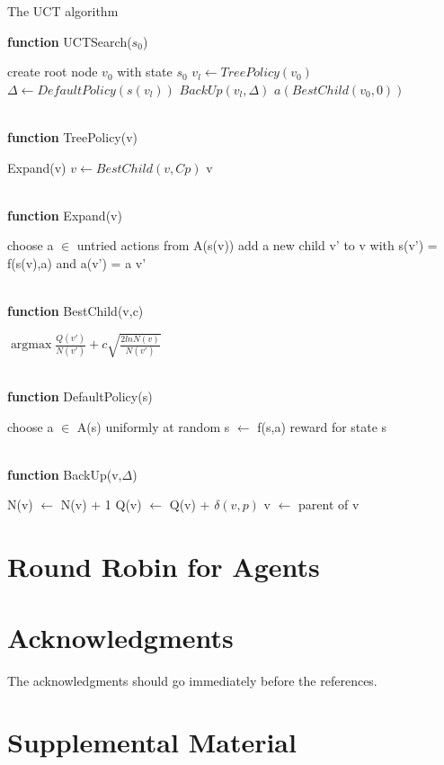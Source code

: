 \documentclass[11pt,a4paper]{article}
\begin{document}
\begin{algorithm}[h]
\caption{The UCT algorithm} 
\hspace*{0.02in} {\bf function} 
UCTSearch($s_0$) 
\begin{algorithmic}
\State create root node $v_0$ with state $s_0$
	\State $v_l \gets TreePolicy(v_0)$ 
	\State $\Delta \gets DefaultPolicy(s(v_l))$ 
	\State $BackUp(v_l, \Delta)$
\EndWhile
\State \Return $a(BestChild(v_0, 0))$
\end{algorithmic}
~\\
\hspace*{0.02in} {\bf function}
TreePolicy(v)
\begin{algorithmic}
		\State \Return Expand(v)
	\Else
		\State $v \gets BestChild(v, Cp)$
	\EndIf
\EndWhile
\State \Return v
\end{algorithmic}
~\\
\hspace*{0.02in} {\bf function}
Expand(v)
\begin{algorithmic}
\State choose a $\in$ untried actions from A(s(v))
\State add a new child v' to v with s(v') = f(s(v),a) and a(v') = a
\State \Return v'
\end{algorithmic}
~\\
\hspace*{0.02in} {\bf function}
BestChild(v,c)
\begin{algorithmic}
\State \Return $\mathop{\arg\max} \frac{Q(v')}{N(v')} + c\sqrt{\frac{2lnN(v)}{N(v')}}$
\end{algorithmic}
~\\
\hspace*{0.02in} {\bf function}
DefaultPolicy(s)
\begin{algorithmic}
	\State choose a $\in$ A(s) uniformly at random
	\State s $\gets$ f(s,a)
\EndWhile
\State \Return reward for state s
\end{algorithmic}
~\\
\hspace*{0.02in} {\bf function}
BackUp(v,$\Delta$)
\begin{algorithmic}
	\State N(v) $\gets$ N(v) + 1
	\State Q(v) $\gets$ Q(v) + $\delta(v, p)$
	\State v $\gets$ parent of v
\EndWhile
\end{algorithmic}
\end{algorithm}



\section{Round Robin for Agents}

\section*{Acknowledgments}

The acknowledgments should go immediately before the references.




\appendix

\section{Supplemental Material}
\end{document}
